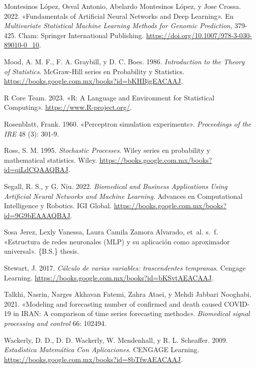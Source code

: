 \documentclass[
  us-letterpaper,
]{scrreprt}
\newlength{\cslhangindent}
\newenvironment{CSLReferences}[2] %
 {\begin{list}{}{%
  \setlength{\itemindent}{0pt}
  \setlength{\leftmargin}{0pt}
  \setlength{\parsep}{0pt}
  \ifodd #1
   \setlength{\leftmargin}{\cslhangindent}
   \setlength{\itemindent}{-1\cslhangindent}
  \fi
  \setlength{\itemsep}{#2\baselineskip}}}
 {\end{list}}
\theoremstyle{definition}
\theoremstyle{plain}
\theoremstyle{plain}
\theoremstyle{definition}
\theoremstyle{remark}
\begin{document}
\begin{CSLReferences}{1}{0}
Montesinos López, Osval Antonio, Abelardo Montesinos López, y Jose
Crossa. 2022. {«Fundamentals of Artificial Neural Networks and Deep
Learning»}. En \emph{Multivariate Statistical Machine Learning Methods
for Genomic Prediction}, 379-425. Cham: Springer International
Publishing. \url{https://doi.org/10.1007/978-3-030-89010-0_10}.

Mood, A. M. F., F. A. Graybill, y D. C. Boes. 1986. \emph{Introduction
to the Theory of Statistics}. McGraw-Hill series en Probability y
Statistics. \url{https://books.google.com.mx/books?id=bKHBjgEACAAJ}.

R Core Team. 2023. {«R: A Language and Environment for Statistical
Computing»}. \url{https://www.R-project.org/}.

Rosenblatt, Frank. 1960. {«Perceptron simulation experiments»}.
\emph{Proceedings of the IRE} 48 (3): 301-9.

Ross, S. M. 1995. \emph{Stochastic Processes}. Wiley series en
probability y mathematical statistics. Wiley.
\url{https://books.google.com.mx/books?id=qiLdCQAAQBAJ}.

Segall, R. S., y G. Niu. 2022. \emph{Biomedical and Business
Applications Using Artificial Neural Networks and Machine Learning}.
Advances en Computational Intelligence y Robotics. IGI Global.
\url{https://books.google.com.mx/books?id=9G9bEAAAQBAJ}.

Sosa Jerez, Lexly Vanessa, Laura Camila Zamora Alvarado, et~al. s.~f.
{«Estructura de redes neuronales (MLP) y su aplicaci{ó}n como
aproximador universal»}. \{B.S.\} thesis.

Stewart, J. 2017. \emph{C{á}lculo de varias variables: trascendentes
tempranas}. Cengage Learning.
\url{https://books.google.com.mx/books?id=bKSvtAEACAAJ}.

Talkhi, Nasrin, Narges Akhavan Fatemi, Zahra Ataei, y Mehdi Jabbari
Nooghabi. 2021. {«Modeling and forecasting number of confirmed and death
caused COVID-19 in IRAN: A comparison of time series forecasting
methods»}. \emph{Biomedical signal processing and control} 66: 102494.

Wackerly, D. D., D. D. Wackerly, W. Mendenhall, y R. L. Scheaffer. 2009.
\emph{Estad{ı́}stica Matem{á}tica Con Aplicaciones}. CENGAGE Learning.
\url{https://books.google.com.mx/books?id=8bTfwAEACAAJ}.


\end{CSLReferences}
\end{document}

